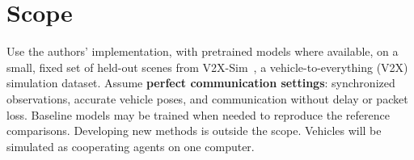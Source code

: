 \section*{Scope}
Use the authors' implementation, with pretrained models where available, on a small, fixed set of held-out scenes from V2X-Sim~\cite{li2022v2xsim}, a vehicle-to-everything (V2X) simulation dataset.
Assume \textbf{perfect communication settings}: synchronized observations, accurate vehicle poses, and communication without delay or packet loss.
Baseline models may be trained when needed to reproduce the reference comparisons.
Developing new methods is outside the scope.
Vehicles will be simulated as cooperating agents on one computer.

